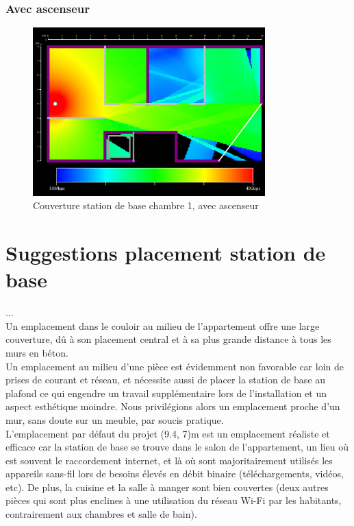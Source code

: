 \subsubsection{Avec ascenseur}

\begin{figure}[H]
    \centering
    \includegraphics[width=0.8\textwidth]{latex/images/highres-chambre1-with-lift.png}
    \caption{Couverture station de base chambre 1, avec ascenseur}
    \label{fig:simu-emplacement-chambre1-avecasc}
\end{figure}


\section{Suggestions placement station de base}

...\\

Un emplacement dans le couloir au milieu de l'appartement offre une large couverture, dû à son placement central et à sa plus grande distance à tous les murs en béton.\\

Un emplacement au milieu d'une pièce est évidemment non favorable car loin de prises de courant et réseau, et nécessite aussi de placer la station de base au plafond ce qui engendre un travail supplémentaire lors de l'installation et un aspect esthétique moindre. Nous privilégions alors un emplacement proche d'un mur, sans doute sur un meuble, par soucis pratique.\\

L'emplacement par défaut du projet (9.4, 7)m est un emplacement réaliste et efficace car la station de base se trouve dans le salon de l'appartement, un lieu où est souvent le raccordement internet, et là où sont majoritairement utilisés les appareils sans-fil lors de besoins élevés en débit binaire (téléchargements, vidéos, etc). De plus, la cuisine et la salle à manger sont bien couvertes (deux autres pièces qui sont plus enclines à une utilisation du réseau Wi-Fi par les habitants, contrairement aux chambres et salle de bain).\\

